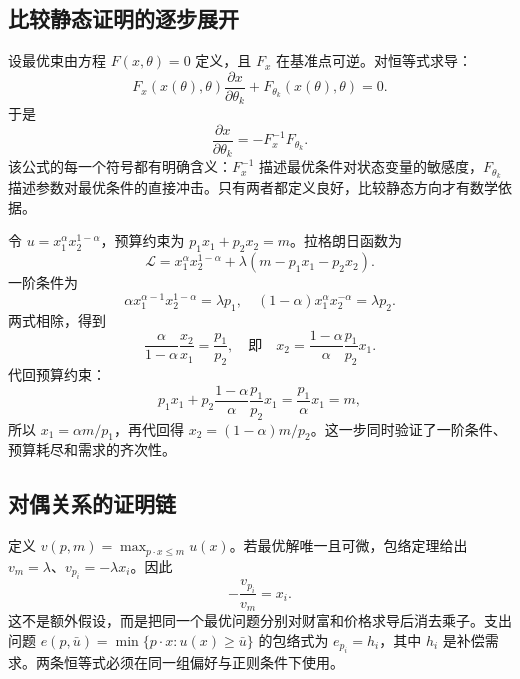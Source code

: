 \subsection{比较静态证明的逐步展开}
设最优束由方程 $F(x,\theta)=0$ 定义，且 $F_x$ 在基准点可逆。对恒等式求导：
\[
F_x(x(\theta),\theta)\frac{\partial x}{\partial\theta_k}+F_{\theta_k}(x(\theta),\theta)=0.
\]
于是
\[
\frac{\partial x}{\partial\theta_k}=-F_x^{-1}F_{\theta_k}.
\]
该公式的每一个符号都有明确含义：$F_x^{-1}$ 描述最优条件对状态变量的敏感度，$F_{\theta_k}$ 描述参数对最优条件的直接冲击。只有两者都定义良好，比较静态方向才有数学依据。

\begin{example}
令 $u=x_1^\alpha x_2^{1-\alpha}$，预算约束为 $p_1x_1+p_2x_2=m$。拉格朗日函数为
\[
\mathcal L=x_1^\alpha x_2^{1-\alpha}+\lambda(m-p_1x_1-p_2x_2).
\]
一阶条件为
\[
\alpha x_1^{\alpha-1}x_2^{1-\alpha}=\lambda p_1,
\quad (1-\alpha)x_1^\alpha x_2^{-\alpha}=\lambda p_2.
\]
两式相除，得到
\[
\frac{\alpha}{1-\alpha}\frac{x_2}{x_1}=\frac{p_1}{p_2},
\quad\text{即}\quad x_2=\frac{1-\alpha}{\alpha}\frac{p_1}{p_2}x_1.
\]
代回预算约束：
\[
p_1x_1+p_2\frac{1-\alpha}{\alpha}\frac{p_1}{p_2}x_1
=\frac{p_1}{\alpha}x_1=m,
\]
所以 $x_1=\alpha m/p_1$，再代回得 $x_2=(1-\alpha)m/p_2$。这一步同时验证了一阶条件、预算耗尽和需求的齐次性。
\end{example}

\subsection{对偶关系的证明链}
定义 $v(p,m)=\max_{p\cdot x\le m}u(x)$。若最优解唯一且可微，包络定理给出
$v_m=\lambda$、$v_{p_i}=-\lambda x_i$。因此
\[
-\frac{v_{p_i}}{v_m}=x_i.
\]
这不是额外假设，而是把同一个最优问题分别对财富和价格求导后消去乘子。支出问题
$e(p,\bar u)=\min\{p\cdot x:u(x)\ge\bar u\}$ 的包络式为 $e_{p_i}=h_i$，其中 $h_i$ 是补偿需求。两条恒等式必须在同一组偏好与正则条件下使用。

